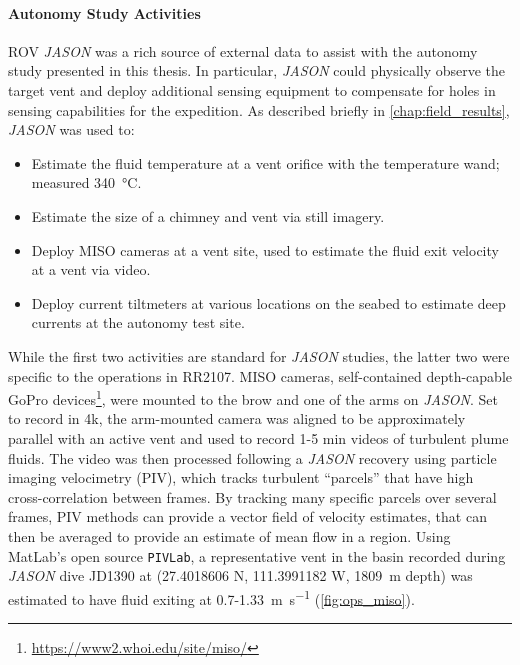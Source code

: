 \paragraph{Autonomy Study Activities}
ROV \emph{JASON} was a rich source of external data to assist with the autonomy study presented in this thesis. In particular, \emph{JASON} could physically observe the target vent and deploy additional sensing equipment to compensate for holes in \Sentry sensing capabilities for the expedition. As described briefly in \cref{chap:field_results}, \emph{JASON} was used to:
\begin{itemize}
  \item Estimate the fluid temperature at a vent orifice with the temperature wand; measured \SI{340}{\celsius}.
  \item Estimate the size of a chimney and vent via still imagery.
  \item Deploy MISO cameras at a vent site, used to estimate the fluid exit velocity at a vent via video.
  \item Deploy current tiltmeters at various locations on the seabed to estimate deep currents at the autonomy test site.
\end{itemize}

While the first two activities are standard for \emph{JASON} studies, the latter two were specific to the operations in RR2107. 
MISO cameras, self-contained depth-capable GoPro devices\footnote{\url{https://www2.whoi.edu/site/miso/}}, were mounted to the brow and one of the arms on \emph{JASON}. Set to record in 4k, the arm-mounted camera was aligned to be approximately parallel with an active vent and used to record 1-5 min videos of turbulent plume fluids. The video was then processed following a \emph{JASON} recovery using particle imaging velocimetry (PIV)\autocite{zhang2019time}, which tracks turbulent ``parcels'' that have high cross-correlation between frames. By tracking many specific parcels over several frames, PIV methods can provide a vector field of velocity estimates, that can then be averaged to provide an estimate of mean flow in a region. Using MatLab's open source \verb|PIVLab|, a representative vent in the basin recorded during \emph{JASON} dive JD1390 at (27.4018606 N, 111.3991182 W, \SI{1809}{\meter} depth) was estimated to have fluid exiting at 0.7-\SI{1.33}{\meter\per\second} (\cref{fig:ops_miso}).

